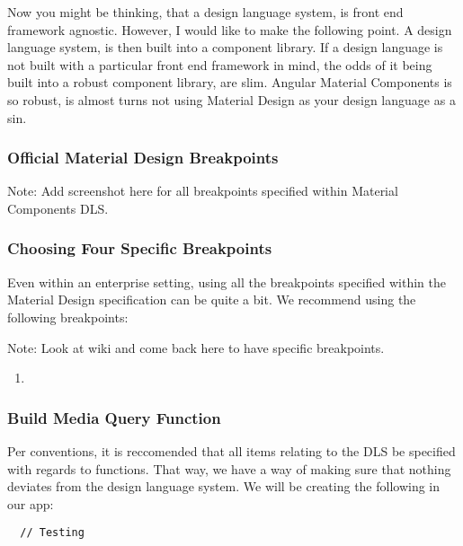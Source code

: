 Now you might be thinking, that a design language system, is front end framework
agnostic. However, I would like to make the following point. A design language
system, is then built into a component library. If a design language is not
built with a particular front end framework in mind, the odds of it being
built into a robust component library, are slim. Angular Material Components is
so robust, is almost turns not using Material Design as your design language as
a sin.

\subsubsection{ Official Material Design Breakpoints }
Note: Add screenshot here for all breakpoints specified within Material
Components DLS.

\subsubsection{ Choosing Four Specific Breakpoints }
Even within an enterprise setting, using all the breakpoints specified within
the Material Design specification can be quite a bit. We recommend using the
following breakpoints:

Note: Look at wiki and come back here to have specific breakpoints.
\begin{enumerate}
  \item
\end{enumerate}

\subsubsection{ Build Media Query Function }
Per conventions, it is reccomended that all items relating to the DLS be
specified with regards to functions. That way, we have a way of making sure
that nothing deviates from the design language system. We will be creating
the following in our app:

\begin{verbatim}
  // Testing
\end{verbatim}

